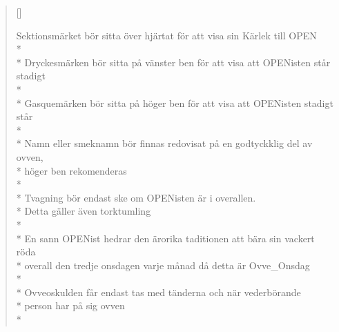 
\settowidth{\versewidth}{Bakom brödbutiken bodde Baskerbosses båda bröder,}


\begin{verse}[\versewidth]


Sektionsmärket bör sitta över hjärtat för att visa sin Kärlek till OPEN\\*
\\*
Dryckesmärken bör sitta på vänster ben för att visa att OPENisten står stadigt\\*
\\*
Gasquemärken bör sitta på höger ben för att visa att OPENisten stadigt står\\*
\\*
Namn eller smeknamn bör finnas redovisat på en godtyckklig del av ovven,\\*
höger ben rekomenderas\\*
\\*
Tvagning bör endast ske om OPENisten är i overallen.\\*
Detta gäller även torktumling\\*
\\*
En sann OPENist hedrar den ärorika taditionen att bära sin vackert röda\\*
overall den tredje onsdagen varje månad då detta är Ovve_Onsdag\\*
\\*
Ovveoskulden får endast tas med tänderna och när vederbörande\\*
person har på sig ovven\\*




\end{verse}

